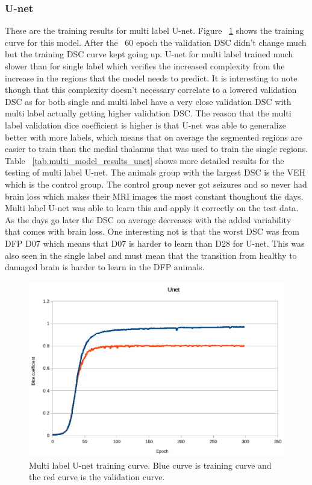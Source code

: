 \subsubsection{U-net}
    These are the training results for multi label U-net. Figure ~\ref{fig:results_multi_unet_train} shows the training curve for this model.
    After the ~60 epoch the validation DSC didn't change much but the training DSC curve kept going up. 
    U-net for multi label trained much slower than for single label which verifies the increased complexity from the increase in the regions that the model needs to predict. 
    It is interesting to note though that this complexity doesn't necessary correlate to a lowered validation DSC as for both single and multi label have a very close validation DSC with multi label actually getting higher validation DSC.
    The reason that the multi label validation dice coefficient is higher is that U-net was able to generalize better with more labels, which means that on average the segmented regions are easier to train than the medial thalamus that was used to train the single regions. 
    Table ~\ref{tab.multi_model_results_unet} shows more detailed results for the testing of multi label U-net. 
    The animals group with the largest DSC is the VEH which is the control group.
    The control group never got seizures and so never had brain loss which makes their MRI images the most constant thoughout the days. 
    Multi label U-net was able to learn this and apply it correctly on the test data.
    As the days go later the DSC on average decreases with the added variability that comes with brain loss.
    One interesting not is that the worst DSC was from DFP D07 which means that D07 is harder to learn than D28 for U-net. 
    This was also seen in the single label and must mean that the transition from healthy to damaged brain is harder to learn in the DFP animals. 
     


\begin{figure}[!tbh]
\centering
\includegraphics[width=\textwidth]{results/train_results_multi_unet.png}
\caption{Multi label U-net training curve. Blue curve is training curve and the red curve is the validation curve. }
\label{fig:results_multi_unet_train}
\end{figure}

